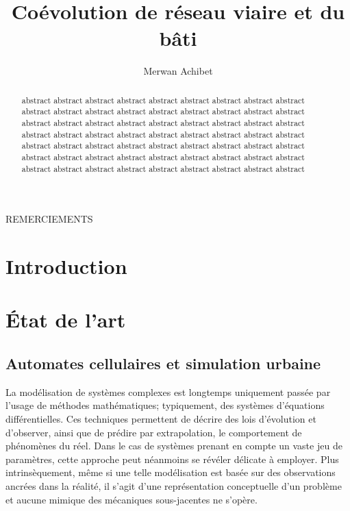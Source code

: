 \documentclass[10pt]{article}
\title{Coévolution de réseau viaire et du bâti}
\author{Merwan Achibet}
\date{}
\begin{document}
\maketitle

\begin{abstract}
abstract abstract abstract abstract abstract abstract abstract
abstract abstract abstract abstract abstract abstract abstract
abstract abstract abstract abstract abstract abstract abstract
abstract abstract abstract abstract abstract abstract abstract
abstract abstract abstract abstract abstract abstract abstract
abstract abstract abstract abstract abstract abstract abstract
abstract abstract abstract abstract abstract abstract abstract
abstract abstract abstract abstract abstract abstract abstract
abstract abstract abstract abstract abstract abstract abstract
\end{abstract}

\newpage

\tableofcontents

\newpage

REMERCIEMENTS

\newpage

\section*{Introduction}

\section{\'Etat de l'art}

\subsection{Automates cellulaires et simulation urbaine}

La modélisation de systèmes complexes est longtemps uniquement passée
par l'usage de méthodes mathématiques; typiquement, des systèmes
d'équations différentielles. Ces techniques permettent de décrire des
lois d'évolution et d'observer, ainsi que de prédire par
extrapolation, le comportement de phénomènes du réel. Dans le cas de
systèmes prenant en compte un vaste jeu de paramètres, cette approche
peut néanmoins se révéler délicate à employer. Plus intrinsèquement,
même si une telle modélisation est basée sur des observations ancrées
dans la réalité, il s'agit d'une représentation conceptuelle d'un
problème et aucune mimique des mécaniques sous-jacentes ne s'opère.
\end{document}
